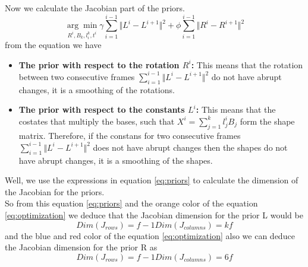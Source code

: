 \noindent Now we calculate the Jacobian part of the priors.\\
\begin{equation}\label{eq:priors}
\underset{R^{i},B_{k},l_{i}^{k},t^{i}}{\arg\min}
\gamma\sum_{i=1}^{i-1}\Vert L^{i}-L^{i+1} \Vert^{2}+
\phi\sum_{i=1}^{i-1}\Vert R^{i}-R^{i+1} \Vert^{2}
\end{equation}
\noindent from the equation we have
\begin{itemize}
\item \textbf{The prior with respect to the rotation $R^{i}$:} This means that the rotation between two consecutive frames $\sum_{i=1}^{i-1}\Vert L^{i}-L^{i+1} \Vert^{2}$ do not have abrupt changes, it is a smoothing of the rotations.
\item \textbf{The prior with respect to the constants $L^{i}$:} This means that the costates that multiply the bases, such that $X^{i}=\sum_{j=1}^{k}l^{i}_{j}B_{j}$ form the shape matrix. Therefore, if the constans for two consecutive frames $\sum_{i=1}^{i-1}\Vert L^{i}-L^{i+1} \Vert^{2}$ does not have abrupt changes then the shapes do not have abrupt changes, it is a smoothing of the shapes.
\end{itemize}

\noindent Well, we use the expressions in equation \ref{eq:priors} to calculate the dimension of the Jacobian for the priors.\\

\noindent So from this equation \ref{eq:priors} and the orange color of the equation \ref{eq:optimization} we deduce that the Jacobian dimension for the prior L would be 
\begin{equation}
Dim(J_{rows})=f-1
Dim(J_{columns})=kf
\end{equation}
\noindent and the blue and red color of the equation \ref{eq:optimization} also we can deduce the Jacobian dimension for the prior R as
\begin{equation}
Dim(J_{rows})=f-1
Dim(J_{columns})=6f
\end{equation}

